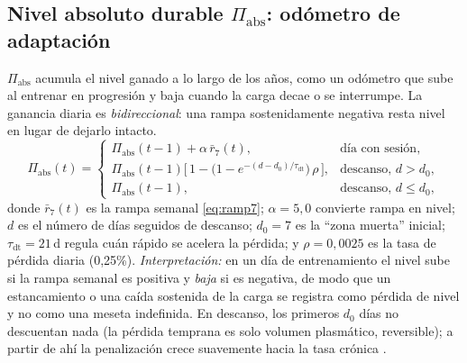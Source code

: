 \documentclass[11pt,a4paper]{article}
\begin{document}
\subsection{Nivel absoluto durable $\Pi_{\mathrm{abs}}$: odómetro de adaptación}
\label{sec:piabs}
$\Pi_{\mathrm{abs}}$ acumula el nivel ganado a lo largo de los años, como un odómetro que sube al entrenar en progresión y baja cuando la carga decae o se interrumpe. La ganancia diaria es \emph{bidireccional}: una rampa sostenidamente negativa resta nivel en lugar de dejarlo intacto.
\begin{equation}
\Pi_{\mathrm{abs}}(t) =
\begin{cases}
\Pi_{\mathrm{abs}}(t-1) + \alpha\,\bar{r}_7(t), & \text{día con sesión},\\[6pt]
\Pi_{\mathrm{abs}}(t-1)\Big[\,1 - \big(1-e^{-(d-d_0)/\tau_{\mathrm{dt}}}\big)\,\rho\,\Big], & \text{descanso, } d > d_0,\\[6pt]
\Pi_{\mathrm{abs}}(t-1), & \text{descanso, } d \le d_0,
\end{cases}
\label{eq:piabs}
\end{equation}
donde $\bar{r}_7(t)$ es la rampa semanal \eqref{eq:ramp7}; $\alpha=5{,}0$ convierte rampa en nivel; $d$ es el número de días seguidos de descanso; $d_0=7$ es la ``zona muerta'' inicial; $\tau_{\mathrm{dt}}=21$\,d regula cuán rápido se acelera la pérdida; y $\rho=0{,}0025$ es la tasa de pérdida diaria (0,25\%). \textit{Interpretación:} en un día de entrenamiento el nivel sube si la rampa semanal es positiva y \emph{baja} si es negativa, de modo que un estancamiento o una caída sostenida de la carga se registra como pérdida de nivel y no como una meseta indefinida. En descanso, los primeros $d_0$ días no descuentan nada (la pérdida temprana es solo volumen plasmático, reversible); a partir de ahí la penalización crece suavemente hacia la tasa crónica \citep{coyle1984,mujika2000a,mujika2000b}.
\end{document}
